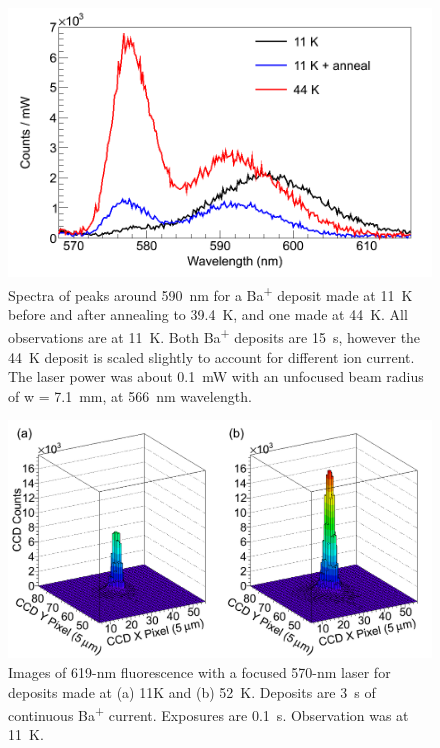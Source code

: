 \begin{figure} %
        \centering
                \includegraphics[width=.7\textwidth]{figures/spectra_temperature_conditions.png}
                \caption{Spectra of peaks around 590~nm for a Ba\textsuperscript{+} deposit made at 11~K before and after annealing to 39.4~K, and one made at 44~K.  All observations are at 11~K.  Both Ba\textsuperscript{+} deposits are 15~s, however the 44~K deposit is scaled slightly to account for different ion current.  The laser power was about 0.1~mW with an unfocused beam radius of w = 7.1~mm, at 566~nm wavelength.}
\label{fig:specTempConditions}
\end{figure}

\begin{figure} [h]
        \centering
                \includegraphics[width=.8\textwidth]{figures/619_deposit_temp.png}
                \caption{Images of 619-nm fluorescence with a focused 570-nm laser for deposits made at (a) 11K and (b) 52~K.  Deposits are 3~s of continuous Ba\textsuperscript{+} current.  Exposures are 0.1~s.  Observation was at 11~K.}
\label{fig:specTempConditions619}
\end{figure}

